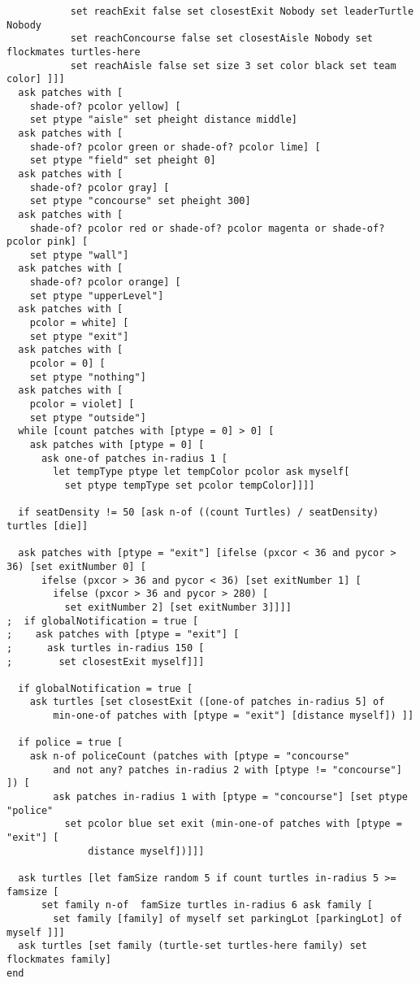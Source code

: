 \documentclass{article}
\begin{document}
\begin{lstlisting}
           set reachExit false set closestExit Nobody set leaderTurtle Nobody  
           set reachConcourse false set closestAisle Nobody set flockmates turtles-here 
           set reachAisle false set size 3 set color black set team color] ]]]
  ask patches with [
    shade-of? pcolor yellow] [
    set ptype "aisle" set pheight distance middle]
  ask patches with [
    shade-of? pcolor green or shade-of? pcolor lime] [
    set ptype "field" set pheight 0]
  ask patches with [
    shade-of? pcolor gray] [
    set ptype "concourse" set pheight 300]
  ask patches with [
    shade-of? pcolor red or shade-of? pcolor magenta or shade-of? pcolor pink] [
    set ptype "wall"]
  ask patches with [
    shade-of? pcolor orange] [
    set ptype "upperLevel"]
  ask patches with [
    pcolor = white] [
    set ptype "exit"]
  ask patches with [
    pcolor = 0] [
    set ptype "nothing"]
  ask patches with [
    pcolor = violet] [
    set ptype "outside"]
  while [count patches with [ptype = 0] > 0] [
    ask patches with [ptype = 0] [
      ask one-of patches in-radius 1 [
        let tempType ptype let tempColor pcolor ask myself[
          set ptype tempType set pcolor tempColor]]]]
 
  if seatDensity != 50 [ask n-of ((count Turtles) / seatDensity) turtles [die]]
  
  ask patches with [ptype = "exit"] [ifelse (pxcor < 36 and pycor > 36) [set exitNumber 0] [
      ifelse (pxcor > 36 and pycor < 36) [set exitNumber 1] [
        ifelse (pxcor > 36 and pycor > 280) [
          set exitNumber 2] [set exitNumber 3]]]] 
;  if globalNotification = true [
;    ask patches with [ptype = "exit"] [
;      ask turtles in-radius 150 [
;        set closestExit myself]]]

  if globalNotification = true [
    ask turtles [set closestExit ([one-of patches in-radius 5] of 
        min-one-of patches with [ptype = "exit"] [distance myself]) ]]
  
  if police = true [
    ask n-of policeCount (patches with [ptype = "concourse" 
        and not any? patches in-radius 2 with [ptype != "concourse"] ]) [
        ask patches in-radius 1 with [ptype = "concourse"] [set ptype "police" 
          set pcolor blue set exit (min-one-of patches with [ptype = "exit"] [
              distance myself])]]]
  
  ask turtles [let famSize random 5 if count turtles in-radius 5 >= famsize [
      set family n-of  famSize turtles in-radius 6 ask family [
        set family [family] of myself set parkingLot [parkingLot] of myself ]]]
  ask turtles [set family (turtle-set turtles-here family) set flockmates family]
end


\end{lstlisting}
\end{document}
